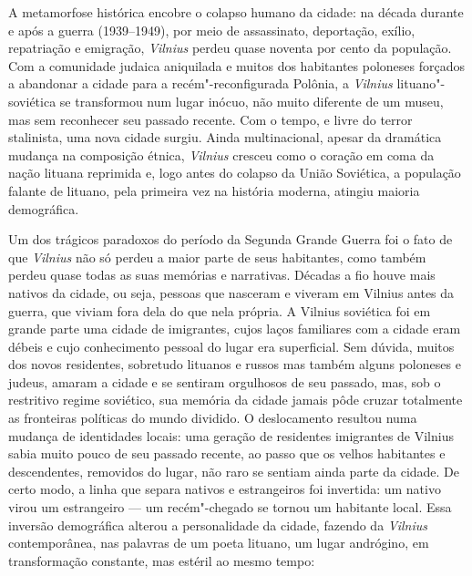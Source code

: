 %

A metamorfose histórica encobre o colapso humano da cidade: na década
durante e após a guerra (1939--1949), por meio de assassinato,
deportação, exílio, repatriação e emigração, \textit{Vilnius} perdeu quase
noventa por cento da população. Com a comunidade judaica aniquilada e
muitos dos habitantes poloneses forçados a abandonar a cidade para a
recém"-reconfigurada Polônia, a \textit{Vilnius} lituano"-soviética se transformou
num lugar inócuo, não muito diferente de um museu, mas sem reconhecer
seu passado recente. Com o tempo, e livre do terror stalinista, uma nova
cidade surgiu. Ainda multinacional, apesar da dramática mudança na
composição étnica, \textit{Vilnius} cresceu como o coração em coma da nação
lituana reprimida e, logo antes do colapso da União Soviética, a
população falante de lituano, pela primeira vez na história moderna,
atingiu maioria demográfica.

Um dos trágicos paradoxos do período da Segunda Grande Guerra foi o fato
de que \textit{Vilnius} não só perdeu a maior parte de seus habitantes, como
também perdeu quase todas as suas memórias e narrativas. Décadas a fio
houve mais nativos da cidade, ou seja, pessoas que nasceram e viveram em
Vilnius antes da guerra, que viviam fora dela do que nela própria. A
Vilnius soviética foi em grande parte uma cidade de imigrantes, cujos
laços familiares com a cidade eram débeis e cujo conhecimento pessoal do
lugar era superficial. Sem dúvida, muitos dos novos residentes,
sobretudo lituanos e russos mas também alguns poloneses e judeus, amaram
a cidade e se sentiram orgulhosos de seu passado, mas, sob o restritivo
regime soviético, sua memória da cidade jamais pôde cruzar totalmente as
fronteiras políticas do mundo dividido. O deslocamento resultou numa
mudança de identidades locais: uma geração de residentes imigrantes de
Vilnius sabia muito pouco de seu passado recente, ao passo que os velhos
habitantes e descendentes, removidos do lugar, não raro se sentiam ainda
parte da cidade. De certo modo, a linha que separa nativos e
estrangeiros foi invertida: um nativo virou um estrangeiro --- um
recém"-chegado se tornou um habitante local. Essa inversão demográfica
alterou a personalidade da cidade, fazendo da \textit{Vilnius} contemporânea, nas
palavras de um poeta lituano, um lugar andrógino, em transformação
constante, mas estéril ao mesmo tempo:

